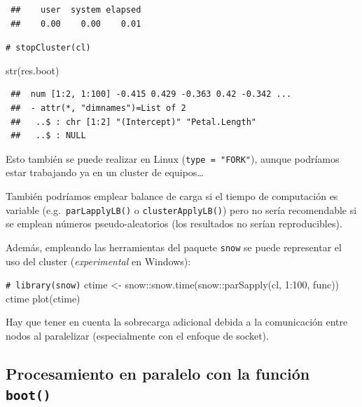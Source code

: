 \documentclass[
  10pt,
]{book}
\newenvironment{Shaded}{\begin{snugshade}}{\end{snugshade}}
\newcommand{\CommentTok}[1]{\textcolor[rgb]{0.56,0.35,0.01}{\textit{#1}}}
\newcommand{\DecValTok}[1]{\textcolor[rgb]{0.00,0.00,0.81}{#1}}
\newcommand{\FunctionTok}[1]{\textcolor[rgb]{0.00,0.00,0.00}{#1}}
\newcommand{\NormalTok}[1]{#1}
\newcommand{\OtherTok}[1]{\textcolor[rgb]{0.56,0.35,0.01}{#1}}
\newcommand{\SpecialCharTok}[1]{\textcolor[rgb]{0.00,0.00,0.00}{#1}}
\theoremstyle{break}
\theoremstyle{nonumberplain}
\renewcommand{\CommentTok}[1]{\textcolor[rgb]{0.41,0.41,0.41}{\texttt{#1}}}
\begin{document}
\begin{verbatim}
 ##    user  system elapsed 
 ##    0.00    0.00    0.01
\end{verbatim}

\begin{Shaded}
\begin{Highlighting}[]
\CommentTok{\# stopCluster(cl)}

\FunctionTok{str}\NormalTok{(res.boot)}
\end{Highlighting}
\end{Shaded}

\begin{verbatim}
 ##  num [1:2, 1:100] -0.415 0.429 -0.363 0.42 -0.342 ...
 ##  - attr(*, "dimnames")=List of 2
 ##   ..$ : chr [1:2] "(Intercept)" "Petal.Length"
 ##   ..$ : NULL
\end{verbatim}

Esto también se puede realizar en Linux (\texttt{type\ =\ "FORK"}), aunque podríamos estar trabajando ya en un cluster de equipos\ldots{}

También podríamos emplear balance de carga si el tiempo de computación es variable (e.g.~\texttt{parLapplyLB()} o \texttt{clusterApplyLB()}) pero no sería recomendable si se emplean números pseudo-aleatorios (los resultados no serían reproducibles).

Además, empleando las herramientas del paquete \texttt{snow} se puede representar el uso del cluster (\emph{experimental} en Windows):

\begin{Shaded}
\begin{Highlighting}[]
\CommentTok{\# library(snow)}
\NormalTok{ctime }\OtherTok{\textless{}{-}}\NormalTok{ snow}\SpecialCharTok{::}\FunctionTok{snow.time}\NormalTok{(snow}\SpecialCharTok{::}\FunctionTok{parSapply}\NormalTok{(cl, }\DecValTok{1}\SpecialCharTok{:}\DecValTok{100}\NormalTok{, func))}
\NormalTok{ctime}
\FunctionTok{plot}\NormalTok{(ctime)}
\end{Highlighting}
\end{Shaded}

Hay que tener en cuenta la sobrecarga adicional debida a la comunicación entre nodos al paralelizar (especialmente con el enfoque de socket).

\hypertarget{procesamiento-en-paralelo-con-la-funciuxf3n-boot}{%
\subsection{\texorpdfstring{Procesamiento en paralelo con la función \texttt{boot()}}{Procesamiento en paralelo con la función boot()}}\label{procesamiento-en-paralelo-con-la-funciuxf3n-boot}}
\end{document}
